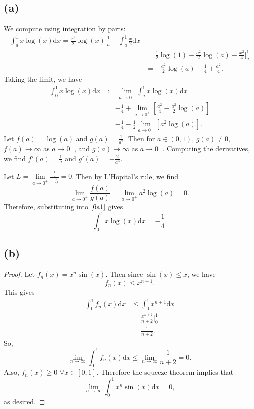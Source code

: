 \documentclass{article}
\begin{document}
\subsection*{(a)}
We compute using integration by parts:
\begin{align}
	\int_a ^1 x \log(x) \mathrm{d}x = \frac{x^2}{2}\log(x)\big|_a ^1 - \int_a ^1 \frac{x}{2}\mathrm{d}x \\
	&= \frac{1}{2}\log(1) - \frac{a^2}{2}\log(a) - \frac{x^2}{4}\big|_a ^1 \\
	&= -\frac{a^2}{2}\log(a) - \frac{1}{4} + \frac{a^2}{4}. 
\end{align}
Taking the limit, we have
\begin{align}
	\int_0 ^1 x \log(x) \mathrm{d}x &:= \lim\limits_{a \to 0^+} \int_a ^1 x \log(x) \mathrm{d}x \\
	&= -\frac{1}{4} + \lim\limits_{a \to 0^+} \left[\frac{a^2}{4} - \frac{a^2}{2}\log(a)\right] \\
	&= -\frac{1}{4} - \frac{1}{2} \lim\limits_{a \to 0^+} \left[a^2 \log(a)\right]. \label{6a1}
\end{align}
Let $f(a) = \log(a)$ and $g(a) = \frac{1}{a^2}$. Then for $a \in (0, 1)$, $g(a) \neq 0$, $f(a) \to \infty$ as $a \to 0^+$, and $g(a) \to \infty$ as $a \to 0^+$. Computing the derivatives, we find $f'(a) = \frac{1}{a}$ and $g'(a) = -\frac{2}{a^3}$. 

Let $L = \lim\limits_{a \to 0^+} \frac{\frac{1}{a}}{-\frac{2}{a^3}} = 0$. Then by L'Hopital's rule, we find
\begin{equation}
	\lim\limits_{a \to 0^+} \frac{f(a)}{g(a)} = \lim\limits_{a \to 0^+} a^2 \log(a) = 0.
\end{equation}
Therefore, substituting into $\eqref{6a1}$ gives 
\begin{equation}
	\int_0 ^1 x\log(x) \mathrm{d}x = -\frac{1}{4}.
\end{equation}

\subsection*{(b)}
\begin{proof}
	Let $f_n(x) = x^n \sin(x)$. Then since $\sin(x) \leq x$, we have
	\begin{equation}
		f_n(x) \leq x^{n+1}.
	\end{equation}
	This gives
	\begin{align}
		\int_0 ^1 f_n(x) \mathrm{d}x &\leq \int_0 ^1 x^{n+1} \mathrm{d}x \\
		&= \frac{x^{n+2}}{n+2}\big|_0 ^1 \\
		&= \frac{1}{n+2}.
	\end{align}
	So,
	\begin{equation}
		\lim\limits_{n \to \infty}\int_0 ^1 f_n(x) \mathrm{d}x \leq \lim\limits_{n \to \infty} \frac{1}{n+2} = 0.
	\end{equation}
	Also, $f_n(x) \geq 0$ $\forall x \in [0, 1]$. Therefore the squeeze theorem implies that
	\begin{equation}
		\lim\limits_{n \to \infty} \int_0 ^1 x^n \sin(x) \mathrm{d}x = 0,
	\end{equation}
	as desired.
\end{proof}
\end{document}
